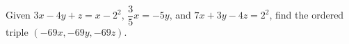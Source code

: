 Given $3x-4y+z=x-2^2$, $\dfrac{3}{5}x=-5y$, and $7x+3y-4z=2^2$, find the ordered triple $(-69x,-69y,-69z)$.
